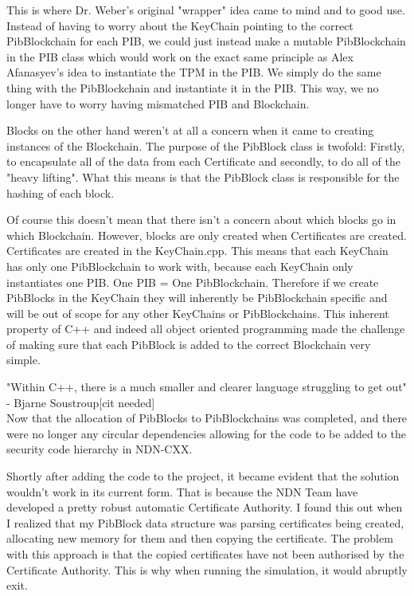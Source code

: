 This is where Dr. Weber's original "wrapper" idea came to mind and to good use. Instead of having to worry about the KeyChain pointing to the correct PibBlockchain for each PIB, we could just instead make a mutable PibBlockchain in the PIB class which would work on the exact same principle as Alex Afanasyev's idea to instantiate the TPM in the PIB. We simply do the same thing with the PibBlockchain and instantiate it in the PIB. This way, we no longer have to worry having mismatched PIB and Blockchain. 

Blocks on the other hand weren't at all a concern when it came to creating instances of the Blockchain. The purpose of the PibBlock class is twofold: Firstly, to encapsulate all of the data from each Certificate and secondly, to do all of the "heavy lifting". What this means is that the PibBlock class is responsible for the hashing of each block. 

Of course this doesn't mean that there isn't a concern about which blocks go in which Blockchain. However, blocks are only created when Certificates are created. Certificates are created in the KeyChain.cpp. This means that each KeyChain has only one PibBlockchain to work with, because each KeyChain only instantiates one PIB. One PIB = One PibBlockchain. Therefore if we create PibBlocks in the KeyChain they will inherently be PibBlockchain specific and will be out of scope for any other KeyChains or PibBlockchains. This inherent property of C++ and indeed all object oriented programming made the challenge of making sure that each PibBlock is added to the correct Blockchain very simple.

"Within C++, there is a much smaller and clearer language struggling to get out" - Bjarne Soustroup[cit needed]
\\


Now that the allocation of PibBlocks to PibBlockchains was completed, and there were no longer any circular dependencies allowing for the code to be added to the security code hierarchy in NDN-CXX. \par 

Shortly after adding the code to the project, it became evident that the solution wouldn't work in its current form. That is because the NDN Team have developed a pretty robust automatic Certificate Authority. I found this out when I realized that my PibBlock data structure was parsing certificates being created, allocating new memory for them and then copying the certificate. The problem with this approach is that the copied certificates have not been authorised by the Certificate Authority. This is why when running the simulation, it would abruptly exit. 

